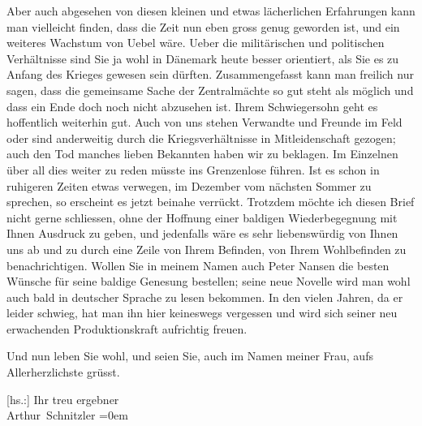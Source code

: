 \pstart
           Aber auch abgesehen von diesen kleinen und etwas lächerlichen Erfahrungen kann man
               vielleicht finden, dass die Zeit nun eben gross genug geworden ist, und ein weiteres
               Wachstum von Uebel wäre. Ueber die militärischen und politischen Verhältnisse sind
               Sie ja wohl in Dänemark heute besser
               orientiert, als Sie es zu Anfang des Krieges gewesen \introOben{}sein\introOben{}
               dürften. Zusammengefasst kann man freilich nur sagen, dass die gemeinsame Sache der
               Zentralmächte so gut steht als möglich und dass ein Ende doch noch nicht abzusehen
               ist. Ihrem Schwiegersohn geht
               es hoffentlich weiterhin gut. Auch von uns stehen Verwandte und Freunde im Feld oder
               sind anderweitig durch die Kriegsverhältnisse in Mitleidenschaft gezogen; auch den
               Tod manches lieben {\pb}Bekannten haben wir zu
               beklagen. Im Einzelnen über all dies weiter zu reden müsste ins Grenzenlose führen.
               Ist es schon in ruhigeren Zeiten etwas verwegen, im Dezember vom nächsten Sommer zu
               sprechen, so erscheint es jetzt beinahe verrückt. Trotzdem möchte ich diesen Brief
               nicht gerne schliessen, ohne der Hoffnung einer baldigen Wiederbegegnung mit Ihnen
               Ausdruck zu geben, und jedenfalls wäre es sehr liebenswürdig von Ihnen uns ab und zu
               durch eine Zeile von Ihrem Befinden, von Ihrem Wohlbefinden zu benachrichtigen.
               Wollen Sie in meinem Namen auch Peter Nansen
               die besten Wünsche für seine baldige Genesung bestellen; seine neue Novelle wird man wohl auch bald in
               deutscher Sprache zu lesen bekommen. In den vielen Jahren, da er leider schwieg, hat
               man ihn hier keineswegs vergessen\strikeout{,} und wird sich
               seiner neu erwachenden Produktionskraft aufrichtig freuen.\pend
           
\pstart
           Und nun leben Sie wohl, und seien Sie, auch im Namen meiner Frau, aufs Allerherzlichste grüsst.\pend
           
\pstart
           {[}hs.:{]} Ihr treu ergebner{\\[\baselineskip]}\spacefill\mbox{Arthur Schnitzler}\pend
           \leftskip=0em{}\endnumbering{}  
      